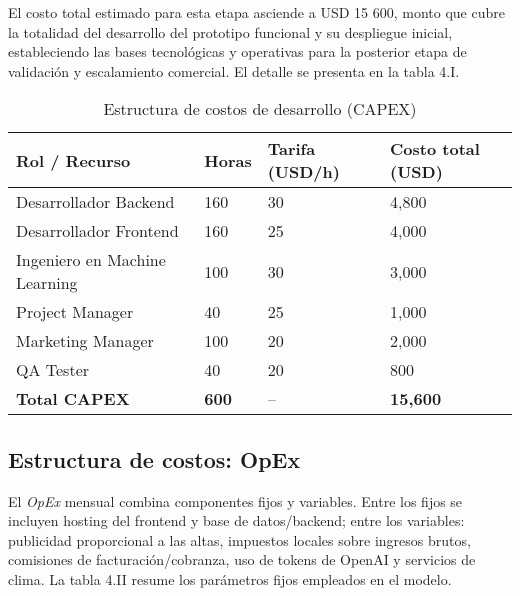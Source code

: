 El costo total estimado para esta etapa asciende a USD 15 600, monto que cubre la totalidad del desarrollo del prototipo funcional y su despliegue inicial, estableciendo las bases tecnológicas y operativas para la posterior etapa de validación y escalamiento comercial. El detalle se presenta en la tabla 4.I.

\begin{table}[t]
    \centering
    \renewcommand{\arraystretch}{1.3}
    \caption{Estructura de costos de desarrollo (CAPEX)}
    \label{tab:capex}
    \begin{tabular}{|p{4.5cm}|p{2.2cm}|p{2.5cm}|p{2.5cm}|}
        \hline
        \textbf{Rol / Recurso} & \textbf{Horas} & \textbf{Tarifa (USD/h)} & \textbf{Costo total (USD)} \\
        \hline
        Desarrollador Backend & 160 & 30 & 4,800 \\
        \hline
        Desarrollador Frontend & 160 & 25 & 4,000 \\
        \hline
        Ingeniero en Machine Learning & 100 & 30 & 3,000 \\
        \hline
        Project Manager & 40 & 25 & 1,000 \\
        \hline
        Marketing Manager & 100 & 20 & 2,000 \\
        \hline
        QA Tester & 40 & 20 & 800 \\
        \hline
        \textbf{Total CAPEX} & \textbf{600} & -- & \textbf{15,600} \\
        \hline
    \end{tabular}
\end{table}



\subsection{Estructura de costos: OpEx}
El \emph{OpEx} mensual combina componentes fijos y variables. Entre los fijos se incluyen hosting del frontend y base de datos/backend; entre los variables: publicidad proporcional a las altas, impuestos locales sobre ingresos brutos, comisiones de facturación/cobranza, uso de tokens de OpenAI y servicios de clima. La tabla 4.II resume los parámetros fijos empleados en el modelo.

